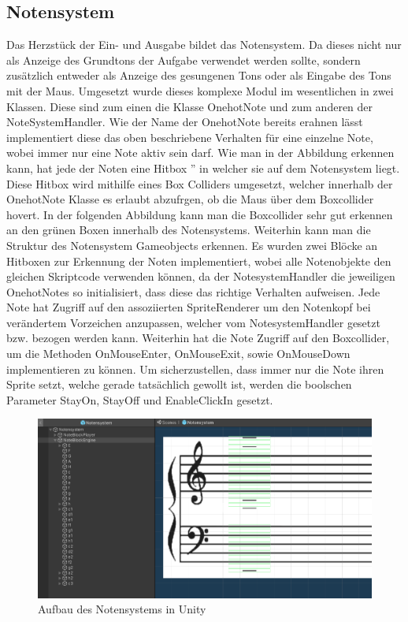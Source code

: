 \subsection*{Notensystem}
Das Herzstück der Ein- und Ausgabe bildet das Notensystem. Da dieses nicht nur als Anzeige des Grundtons der Aufgabe verwendet werden sollte, sondern zusätzlich entweder als Anzeige des gesungenen Tons oder als Eingabe des Tons mit der Maus. Umgesetzt wurde dieses komplexe Modul im wesentlichen in zwei Klassen. Diese sind zum einen die Klasse OnehotNote und zum anderen der NoteSystemHandler. Wie der Name der OnehotNote bereits erahnen lässt implementiert diese das oben beschriebene Verhalten für eine einzelne Note, wobei immer nur eine Note aktiv sein darf. Wie man in der Abbildung erkennen kann, hat jede der Noten eine \glqq Hitbox '' in welcher sie auf dem Notensystem liegt. Diese Hitbox wird mithilfe eines Box Colliders umgesetzt, welcher innerhalb der OnehotNote Klasse es erlaubt abzufrgen, ob die Maus über dem Boxcollider hovert. In der folgenden Abbildung kann man die Boxcollider sehr gut erkennen an den grünen Boxen innerhalb des Notensystems. Weiterhin kann man die Struktur des Notensystem Gameobjects erkennen. Es wurden zwei Blöcke an Hitboxen zur Erkennung der Noten implementiert, wobei alle Notenobjekte den gleichen Skriptcode verwenden können, da der NotesystemHandler die jeweiligen OnehotNotes so initialisiert, dass diese das richtige Verhalten aufweisen. Jede Note hat Zugriff auf den assoziierten SpriteRenderer um den Notenkopf bei verändertem Vorzeichen anzupassen, welcher vom NotesystemHandler gesetzt bzw. bezogen werden kann. Weiterhin hat die Note Zugriff auf den Boxcollider, um die Methoden OnMouseEnter, OnMouseExit, sowie OnMouseDown implementieren zu können. Um sicherzustellen, dass immer nur die Note ihren Sprite setzt, welche gerade tatsächlich gewollt ist, werden die boolschen Parameter StayOn, StayOff und EnableClickIn gesetzt. 

\begin{figure}[H]
    \centering
    \includegraphics[width=1\textwidth]{Bilder/notensystem.png}
    \caption{Aufbau des Notensystems in Unity}
    \label{sec:hps_algo}
\end{figure}

